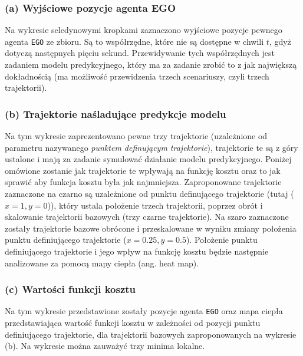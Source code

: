 \subsubsection{(a) Wyjściowe pozycje agenta EGO}
Na wykresie seledynowymi kropkami zaznaczono wyjściowe pozycje pewnego agenta \texttt{EGO} ze zbioru. Są to współrzędne, które nie są dostępne w chwili $t$, gdyż dotyczą następnych pięciu sekund. Przewidywanie tych współrzędnych jest zadaniem modelu predykcyjnego, który ma za zadanie zrobić to z jak największą dokładnością (ma możliwość przewidzenia trzech scenariuszy, czyli trzech trajektorii).
\subsubsection{(b) Trajektorie naśladujące predykcje modelu}
Na tym wykresie zaprezentowano pewne trzy trajektorie (uzależnione od parametru nazywanego \textit{punktem definującym trajektorie}), trajektorie te są z góry ustalone i mają za zadanie symulować działanie modelu predykcyjnego. Poniżej omówione zostanie jak trajektorie te wpływają na funkcję kosztu oraz to jak sprawić aby funkcja kosztu była jak najmniejsza. Zaproponowane trajektorie zaznaczone na czarno są uzależnione od punktu definującego trajektorie (tutaj ($x=1, y=0$)), który ustala położenie trzech trajektorii, poprzez obrót i skalowanie trajektorii bazowych (trzy czarne trajektorie). Na szaro zaznaczone zostały trajektorie bazowe obrócone i przeskalowane w wyniku zmiany położenia punktu definiującego trajektorie ($x=0.25, y=0.5$). Położenie punktu definiującego trajektorie i jego wpływ na funkcję kosztu będzie następnie analizowane za pomocą mapy ciepła (ang. heat map).
\subsubsection{(c) Wartości funkcji kosztu}
Na tym wykresie przedstawione zostały pozycje agenta \texttt{EGO} oraz mapa ciepła przedstawiająca wartość funkcji kosztu w zależności od pozycji punktu definiującego trajektorie, dla trajektorii bazowych zaproponowanych na wykresie (b). Na wykresie można zauważyć trzy minima lokalne.
